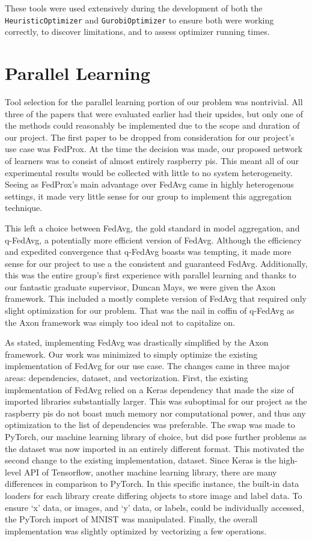 \documentclass[../mthe-493-final-project.tex]{subfiles}
\begin{document}
    These tools were used extensively during the development of both the \texttt{HeuristicOptimizer} and \texttt{GurobiOptimizer} to ensure both were working correctly, to discover limitations, and to assess optimizer running times.

    \section{Parallel Learning}
    \label{sec:parallel-learning-impl}
    Tool selection for the parallel learning portion of our problem was nontrivial. All three of the papers that were evaluated earlier had their upsides, but only one of the methods could reasonably be implemented due to the scope and duration of our project. The first paper to be dropped from consideration for our project’s use case was FedProx. At the time the decision was made, our proposed network of learners was to consist of almost entirely raspberry pis. This meant all of our experimental results would be collected with little to no system heterogeneity. Seeing as FedProx’s main advantage over FedAvg came in highly heterogenous settings, it made very little sense for our group to implement this aggregation technique. 

    This left a choice between FedAvg, the gold standard in model aggregation, and q-FedAvg, a potentially more efficient version of FedAvg. Although the efficiency and expedited convergence that q-FedAvg boasts was tempting, it made more sense for our project to use a the consistent and guaranteed FedAvg. Additionally, this was the entire group’s first experience with parallel learning and thanks to our fantastic graduate supervisor, Duncan Mays, we were given the Axon framework. This included a mostly complete version of FedAvg that required only slight optimization for our problem. That was the nail in coffin of q-FedAvg as the Axon framework was simply too ideal not to capitalize on.
    
    As stated, implementing FedAvg was drastically simplified by the Axon framework. Our work was minimized to simply optimize the existing implementation of FedAvg for our use case. The changes came in three major areas: dependencies, dataset, and vectorization. First, the existing implementation of FedAvg relied on a Keras dependency that made the size of imported libraries substantially larger. This was suboptimal for our project as the raspberry pis do not boast much memory nor computational power, and thus any optimization to the list of dependencies was preferable. The swap was made to PyTorch, our machine learning library of choice, but did pose further problems as the dataset was now imported in an entirely different format. This motivated the second change to the existing implementation, dataset. Since Keras is the high-level API of Tensorflow, another machine learning library, there are many differences in comparison to PyTorch. In this specific instance, the built-in data loaders for each library create differing objects to store image and label data. To ensure ‘x’ data, or images, and ‘y’ data, or labels, could be individually accessed, the PyTorch import of MNIST was manipulated. Finally, the overall implementation was slightly optimized by vectorizing a few operations.
    
\end{document}
